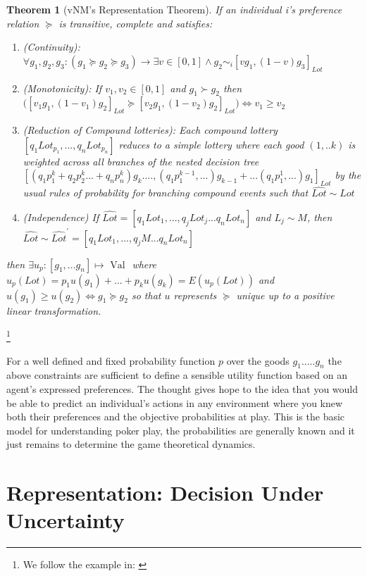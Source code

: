\documentclass{tufte-handout}
\newtheorem{theo}[section]{Theorem}
\newenvironment{ftheo}[1]
  {\begin{mdframed}
  \sloppy
  \begin{theo}[#1]
  }
  {\end{theo}
\end{mdframed}}
\begin{document}
\begin{ftheo}{vNM's Representation Theorem}
If an individual i's preference relation $\succeq$ is transitive, complete and satisfies: \begin{enumerate}
\item (Continuity): $\forall g_{1} , g_{2} , g_{3} : ( g_{1} \succeq g_{2} \succeq g_{3}) \rightarrow \exists v \in [0, 1] \wedge g_{2} \sim_{i} [v g_{1}, (1-v) g_{3}]_{Lot}$
\item (Monotonicity): If $ v_{1}, v_{2} \in [0, 1]$ and $ g_{1} \succ g_{2}$ then  $ \Big( [ v_{1} g_{1}, (1-v_{1})g_{2}]_{Lot} \succeq [ v_{2} g_{1}, (1-v_{2})g_{2}]_{Lot} \Big) \Leftrightarrow v_{1} \geq v_{2}$
\item (Reduction of Compound lotteries): Each compound lottery ${[q_{1}Lot_{p_{1}}, ...,  q_{n}Lot_{p_{n}}]}$ reduces to a simple lottery where each good $(1, .. k)$ is weighted across all branches of the nested decision tree ${[(q_{1}p^{k}_{1} + q_{2}p^{k}_{2} ... + q_{n}p^{k}_{n})g_{k} .... , (q_{1}p^{k-1}_{1} , ...)g_{k-1} + ... (q_{1}p^{1}_{1} , ...)g_{1}]_{Lot}}$ by the usual rules of probability for branching compound events such that $\widehat{Lot} \sim Lot$ 
\item (Independence) If $\widehat{Lot} = [q_{1}Lot_{1}, ..., q_{j}Lot_{j}...q_{n}Lot_{n}]$ and $L_{j} \sim M$, then $\widehat{Lot} \sim \widehat{Lot}^{'} = [q_{1}Lot_{1}, ..., q_{j}M...q_{n}Lot_{n}]$ 
\end{enumerate}  
then $\exists u_{p} : [ g_{1}, ... g_{n}] \mapsto \text{ Val } $ where 
$ u_{p}(Lot) = p_{1}u(g_{1}) + ... + p_{k}u(g_{k}) = E(u_{p}(Lot))$ and  $u(g_{1}) \geq u(g_{2}) \Leftrightarrow g_{1} \succeq g_{2}$ so that $u$ represents $\succeq$ unique up to a positive linear transformation.
\end{ftheo}\footnote{We follow the example in: \cite{GameTheory}}

\noindent For a well defined and fixed probability function $p$ over the goods $g_{1} ..... g_{n}$ the above constraints are sufficient to define a sensible utility function based on an agent's expressed preferences. The thought gives hope to the idea that you would be able to predict an individual's actions in any environment where you knew both their preferences and the objective probabilities at play. This is the basic model for understanding poker play, the probabilities are generally known and it just remains to determine the game theoretical dynamics. 

\section{Representation: Decision Under Uncertainty}
\end{document}
